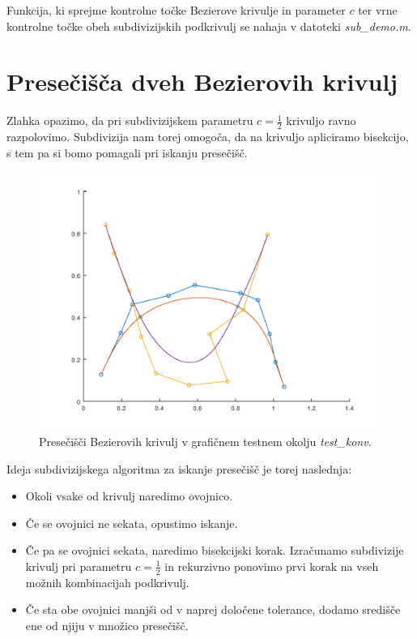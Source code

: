 \documentclass[a4paper, 12pt]{article} %
\begin{document}
Funkcija, ki sprejme kontrolne točke Bezierove krivulje in parameter $c$ ter vrne kontrolne točke obeh subdivizijskih podkrivulj se nahaja v datoteki \emph{sub\_demo.m}.


\section{Presečišča dveh Bezierovih krivulj}

Zlahka opazimo, da pri subdivizijskem parametru $c = \frac{1}{2}$ krivuljo ravno razpolovimo. Subdivizija nam torej omogoča, da na krivuljo apliciramo bisekcijo, s tem pa si bomo pomagali pri iskanju presečišč.
\begin{figure}[h!]
	\centering
	\includegraphics[scale=0.55]{konv}
	\caption{Presečišči Bezierovih krivulj v grafičnem testnem okolju \emph{test\_konv}.}
	\label{fig:konv}
\end{figure}

Ideja subdivizijskega algoritma za iskanje presečišč je torej naslednja:
\begin{itemize}
\item Okoli vsake od krivulj naredimo ovojnico.
\item Če se ovojnici ne sekata, opustimo iskanje.
\item Če pa se ovojnici sekata, naredimo bisekcijski korak. Izračunamo subdivizije krivulj pri parametru $c = \frac{1}{2}$ in rekurzivno ponovimo prvi korak na vseh možnih kombinacijah podkrivulj.
\item Če sta obe ovojnici manjši od v naprej določene tolerance, dodamo središče ene od njiju v množico presečišč.
\end{itemize}
\end{document}
